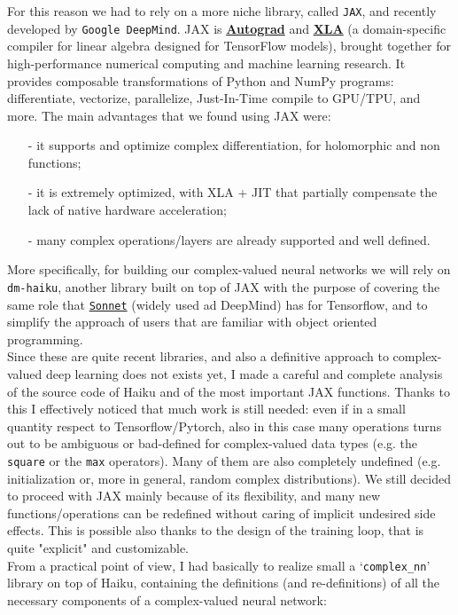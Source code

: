 \documentclass[../main.tex]{subfiles}
\begin{document}
For this reason we had to rely on a more niche library, called \texttt{JAX}, and recently developed by \texttt{Google DeepMind}. JAX is \href{https://github.com/hips/autograd}{\textbf{Autograd}} and \href{https://www.tensorflow.org/xla}{\textbf{XLA}} (a domain-specific compiler for linear algebra designed for TensorFlow models), brought together for high-performance numerical computing and machine learning research. It provides composable transformations of Python and NumPy programs: differentiate, vectorize, parallelize, Just-In-Time compile to GPU/TPU, and more. The main advantages that we found using JAX were:
\begin{itemize}
	\item[-] it supports and optimize complex differentiation, for holomorphic and non functions;
	\item[-] it is extremely optimized, with XLA + JIT that partially compensate the lack of native hardware acceleration;
	\item[-] many complex operations/layers are already supported and well defined.
\end{itemize}
More specifically, for building our complex-valued neural networks we will rely on \texttt{dm-haiku}, another library built on top of JAX with the purpose of covering the same role that \href{https://github.com/deepmind/sonnet}{\texttt{Sonnet}} (widely used ad DeepMind) has for Tensorflow, and to simplify the approach of users that are familiar with object oriented programming.\\
Since these are quite recent libraries, and also a definitive approach to complex-valued deep learning does not exists yet, I made a careful and complete analysis of the source code of Haiku and of the most important JAX functions. Thanks to this I effectively noticed that much work is still needed: even if in a small quantity respect to Tensorflow/Pytorch, also in this case many operations turns out to be ambiguous or bad-defined for complex-valued data types (e.g. the \texttt{square} or the \texttt{max} operators). Many of them are also completely undefined (e.g. initialization or, more in general, random complex distributions). We still decided to proceed with JAX mainly because of its flexibility, and many new functions/operations can be redefined without caring of implicit undesired side effects. This is possible also thanks to the design of the training loop, that is quite "explicit" and customizable.\\
From a practical point of view, I had basically to realize small a `\texttt{complex\_nn}' library on top of Haiku, containing the definitions (and re-definitions) of all the necessary components of a complex-valued neural network:
\end{document}
